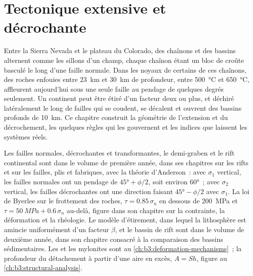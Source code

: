 \chapter{Tectonique extensive et décrochante}\label{ch:b3:extension-strike-slip}

Entre la Sierra Nevada et le plateau du Colorado, des chaînons et des bassins
alternent comme les sillons d'un champ, chaque chaînon étant un bloc de croûte
basculé le long d'une faille normale. Dans les noyaux de certains de ces
chaînons, des roches enfouies entre \qty{23}{km} et \qty{30}{km} de profondeur,
entre \qty{500}{\celsius} et \qty{650}{\celsius}, affleurent aujourd'hui sous une
seule faille au pendage de quelques degrés seulement. Un continent peut être
étiré d'un facteur deux ou plus, et déchiré latéralement le long de failles qui
se coudent, se décalent et ouvrent des bassins profonds de \qty{10}{km}. Ce chapitre
construit la géométrie de l'extension et du décrochement, les quelques règles qui les gouvernent et les indices que laissent les systèmes réels.

\begin{recall}
Les failles normales, décrochantes et transformantes, le demi-graben et le rift
continental sont dans le volume de première année, dans ses chapitres sur les
rifts et sur les failles, plis et fabriques, avec la théorie d'Anderson~: avec $\sigma_1$ vertical, les failles normales
ont un pendage de $\ang{45} + \phi/2$, soit environ \ang{60}~; avec $\sigma_2$ vertical, les failles
décrochantes ont une direction faisant $\ang{45} - \phi/2$ avec $\sigma_1$. La loi de Byerlee sur le frottement des roches,
$\tau = 0.85\,\sigma_n$ en dessous de \qty{200}{MPa} et $\tau =
\qty{50}{MPa} + 0.6\,\sigma_n$ au-delà, figure dans son chapitre sur la contrainte, la déformation et la rhéologie. Le modèle
d'étirement, dans lequel la lithosphère est amincie uniformément d'un facteur $\beta$, et le bassin de rift sont dans le volume de deuxième année, dans son
chapitre consacré à la comparaison des bassins sédimentaires. Les  et les mylonites sont au
\cref{ch:b3:deformation-mechanisms}~; la profondeur du détachement à partir d'une aire en excès,
$A = Sh$, figure au \cref{ch:b3:structural-analysis}.
\end{recall}

